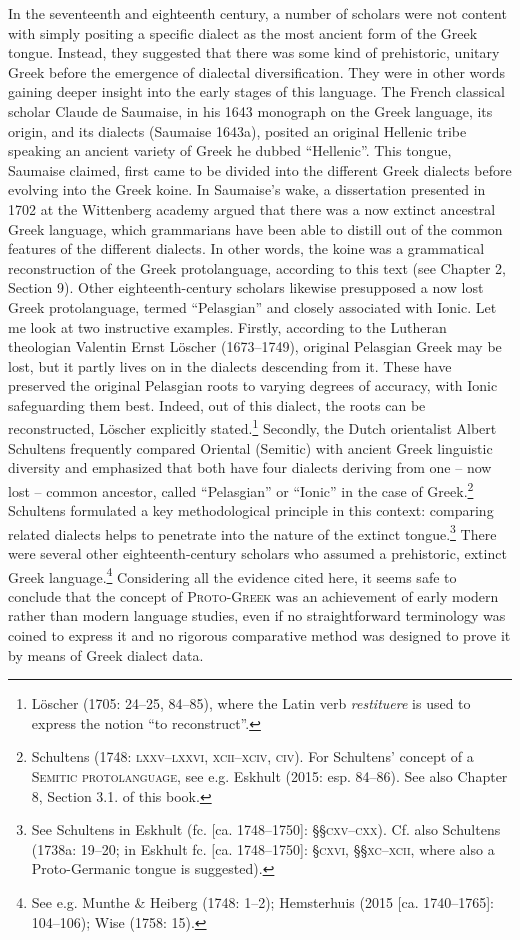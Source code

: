 \begin{styleStandard}
In the seventeenth and eighteenth century, a number of scholars were not content with simply positing a specific dialect as the most ancient form of the Greek tongue. Instead, they suggested that there was some kind of prehistoric, unitary Greek before the emergence of dialectal diversification. They were in other words gaining deeper insight into the early stages of this language. The French classical scholar Claude de Saumaise, in his 1643 monograph on the Greek language, its origin, and its dialects (Saumaise 1643a), posited an original Hellenic tribe speaking an ancient variety of Greek he dubbed “Hellenic”. This tongue, Saumaise claimed, first came to be divided into the different Greek dialects before evolving into the Greek koine. In Saumaise’s wake, a dissertation presented in 1702 at the Wittenberg academy argued that there was a now extinct ancestral Greek language, which grammarians have been able to distill out of the common features of the different dialects. In other words, the koine was a grammatical reconstruction of the Greek protolanguage, according to this text (see Chapter 2, Section 9). Other eighteenth-century scholars likewise presupposed a now lost Greek protolanguage, termed “Pelasgian” and closely associated with Ionic. Let me look at two instructive examples. Firstly, according to the Lutheran theologian Valentin Ernst Löscher (1673–1749), original Pelasgian Greek may be lost, but it partly lives on in the dialects descending from it. These have preserved the original Pelasgian roots to varying degrees of accuracy, with Ionic safeguarding them best. Indeed, out of this dialect, the roots can be reconstructed, Löscher explicitly stated.\footnote{ Löscher (1705: 24–25, 84–85), where the Latin verb \textit{restituere} is used to express the notion “to reconstruct”.} Secondly, the Dutch orientalist Albert Schultens frequently compared Oriental (Semitic) with ancient Greek linguistic diversity and emphasized that both have four dialects deriving from one – now lost – common ancestor, called “Pelasgian” or “Ionic” in the case of Greek.\footnote{ Schultens (1748: \textsc{lxxv–lxxvi, xcii–xciv, civ}). For Schultens’ concept of a \textsc{Semitic protolanguage}, see e.g. Eskhult (2015: esp. 84–86). See also Chapter 8, Section 3.1. of this book.} Schultens formulated a key methodological principle in this context: comparing related dialects helps to penetrate into the nature of the extinct tongue.\footnote{ See Schultens in Eskhult (fc. [ca. 1748–1750]: §§\textsc{cxv–cxx}). Cf. also Schultens (1738a: 19–20; in Eskhult fc. [ca. 1748–1750]: §\textsc{cxvi}, §§\textsc{xc–xcii, }where also a Proto-Germanic tongue is suggested).} There were several other eighteenth-century scholars who assumed a prehistoric, extinct Greek language.\footnote{ See e.g. Munthe \& Heiberg (1748: 1–2); Hemsterhuis (2015 [ca. 1740–1765]: 104–106); Wise (1758: 15).} Considering all the evidence cited here, it seems safe to conclude that the concept of \textsc{Proto-Greek} was an achievement of early modern rather than modern language studies, even if no straightforward terminology was coined to express it and no rigorous comparative method was designed to prove it by means of Greek dialect data.

\end{styleStandard}
